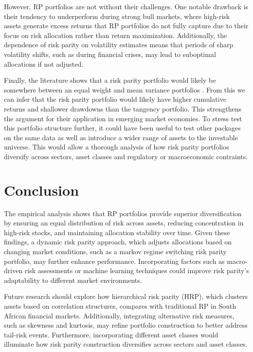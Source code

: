 \documentclass[preprint, 3p,
authoryear]{elsarticle} %
\begin{document}
However, RP portfolios are not without their challenges. One notable
drawback is their tendency to underperform during strong bull markets,
where high-risk assets generate excess returns that RP portfolios do not
fully capture due to their focus on risk allocation rather than return
maximization. Additionally, the dependence of risk parity on volatility
estimates means that periods of sharp volatility shifts, such as during
financial crises, may lead to suboptimal allocations if not adjusted.

Finally, the literature shows that a risk parity portfolio would likely
be somewhere between an equal weight and mean variance portfolios
\citep{gambeta2020}. From this we can infer that the risk parity
portfolio would likely have higher cumulative returns and shallower
drawdowns than the tangency portfolio. This strengthens the argument for
their application in emerging market economies. To stress test this
portfolio structure further, it could have been useful to test other
packages on the same data as well as introduce a wider range of assets
to the investable universe. This would allow a thorough analysis of how
risk parity portfolios diversify across sectors, asset classes and
regulatory or macroeconomic contraints.

\hypertarget{conclusion}{%
\section{Conclusion}\label{conclusion}}

The empirical analysis shows that RP portfolios provide superior
diversification by ensuring an equal distribution of risk across assets,
reducing concentration in high-risk stocks, and maintaining allocation
stability over time. Given these findings, a dynamic risk parity
approach, which adjusts allocations based on changing market conditions,
such as a markov regime switching risk parity portfolio, may further
enhance performance. Incorporating factors such as macro-driven risk
assessments or machine learning techniques could improve risk parity's
adaptability to different market environments.

Future research should explore how hierarchical risk parity (HRP), which
clusters assets based on correlation structures, compares with
traditional RP in South African financial markets. Additionally,
integrating alternative risk measures, such as skewness and kurtosis,
may refine portfolio construction to better address tail-risk events.
Furthermore, incorporating different asset classes would illuminate how
risk parity construction diversifies across sectors and asset classes.
\end{document}

